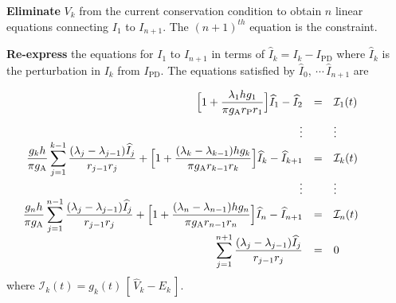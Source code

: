 \documentclass{slides}
\def\ds{\displaystyle}
\begin{document}
%
%
\begin{slide}
\textbf{Eliminate} $V_k$ from the current conservation condition
to obtain $n$ linear equations connecting $I_1$ to $I_{n+1}$. The
$(n+1)^{th}$ equation is the constraint.

\textbf{Re-express} the equations for $I_1$ to $I_{n+1}$ in terms
of $\widehat{I}_k=I_k-I_\mathrm{PD}$ where $\widehat{I}_k$ is the
perturbation in $I_k$ from $I_\mathrm{PD}$. The equations
satisfied by $\widehat{I}_0,\ \cdots \,\widehat{I}_{n+1}$ are

{\tiny
\[
\hskip-30pt\begin{array}{rcl} \ds\Big[1+\frac{\lambda_1 h g_1}{\pi
g_\mathrm{A} r_\mathrm{P}
r_1}\Big]\widehat{I}_1-\widehat{I}_2 & = & \mathcal{I}_1(t) \\[10pt]
\vdots & &\vdots\\
\ds\frac{g_k h}{\pi g_\mathrm{A}}\sum_{j=1}^{k-1}
\frac{(\lambda_j-\lambda_{j-1})\widehat{I}_j}{r_{j-1}r_j}+
\Big[1+\frac{(\lambda_k-\lambda_{k-1})hg_k}{\pi g_\mathrm{A}
r_{k-1}r_k}\Big]\widehat{I}_k-\widehat{I}_{k+1} & = & \mathcal{I}_k(t)\\[10pt]
\vdots & &\vdots\\
\ds\frac{g_n h}{\pi g_\mathrm{A}}\sum_{j=1}^{n-1}
\frac{(\lambda_j-\lambda_{j-1})\widehat{I}_j}{r_{j-1}r_j}+
\Big[1+\frac{(\lambda_n-\lambda_{n-1})hg_n}{\pi g_\mathrm{A}
r_{n-1}r_n}\Big]\widehat{I}_n-\widehat{I}_{n+1} & = & \mathcal{I}_n(t)\\[10pt]
\ds\sum_{j=1}^{n+1}\frac{(\lambda_j-\lambda_{j-1})
\widehat{I}_j}{r_{j-1}r_j} & = & 0
\end{array}
\]
} where $\mathcal{I}_k(t)=g_k(t)\,[\,\widehat{V}_k-E_k\,]$.
\end{slide}
\end{document}
